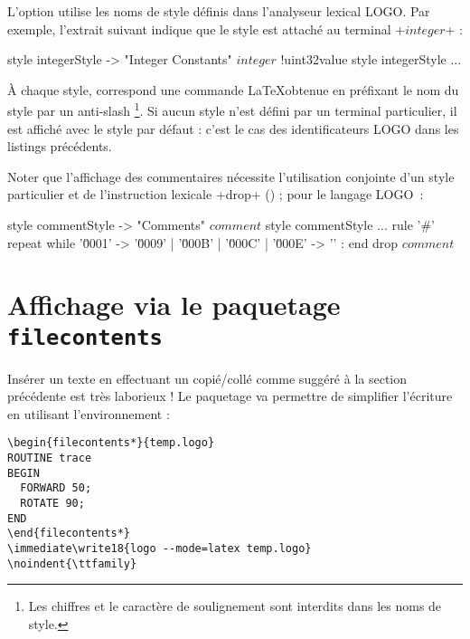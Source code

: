 
L'option  utilise les noms de style définis dans l'analyseur lexical LOGO. Par exemple, l'extrait suivant indique que le style  est attaché au terminal \ggs+$integer$+ :

\begin{galgas}
style integerStyle -> "Integer Constants"
$integer$ !uint32value style integerStyle ...
\end{galgas}

À chaque style, correspond une commande \LaTeX obtenue en préfixant le nom du style par un anti-slash \tpp{\textbackslash}\footnote{Les chiffres et le caractère de soulignement \tpp{\_} sont interdits dans les noms de style.}. Si aucun style n'est défini par un terminal particulier, il est affiché avec le style par défaut : c'est le cas des identificateurs LOGO dans les listings précédents.

Noter que l'affichage des commentaires nécessite l'utilisation conjointe d'un style particulier et de l'instruction lexicale \ggs+drop+ () ; pour le langage LOGO~:

\begin{galgas}
style commentStyle -> "Comments"
$comment$ style commentStyle ...
rule '#' {
  repeat
  while '\u0001' -> '\u0009' | '\u000B' | '\u000C' | '\u000E' -> '\uFFFD' :
  end
  drop $comment$
}
\end{galgas}







\section{Affichage via le paquetage \texttt{f{}ilecontents}}

Insérer un texte en effectuant un copié/collé comme suggéré à la section précédente est très laborieux ! Le paquetage  va permettre de simplifier l'écriture en utilisant l'environnement  :

\begin{verbatim}
\begin{filecontents*}{temp.logo}
ROUTINE trace
BEGIN
  FORWARD 50;
  ROTATE 90;
END
\end{filecontents*}
\immediate\write18{logo --mode=latex temp.logo}
\noindent{\ttfamily}
\end{verbatim}


